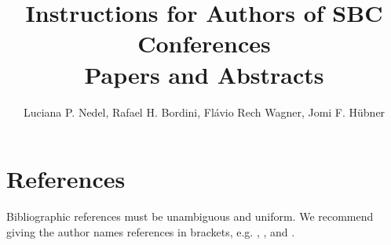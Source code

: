 \documentclass[12pt]{article}
\title{Instructions for Authors of SBC Conferences\\ Papers and Abstracts}
\author{Luciana P. Nedel\inst{1}, Rafael H. Bordini\inst{2}, Flávio Rech
  Wagner\inst{1}, Jomi F. Hübner\inst{3} }
\begin{document}
 

\maketitle









\section{References}

Bibliographic references must be unambiguous and uniform.  We recommend giving
the author names references in brackets, e.g. \cite{knuth:84},
\cite{boulic:91}, and \cite{smith:99}.



\end{document}
